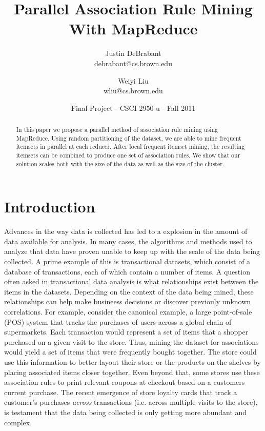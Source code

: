\documentclass[11pt]{article}
\begin{document}
\title{Parallel Association Rule Mining With MapReduce}
\author{Justin DeBrabant \\ debrabant@cs.brown.edu \and Weiyi Liu \\
  wliu@cs.brown.edu}
\date{Final Project - CSCI 2950-u - Fall 2011}
\maketitle

\begin{abstract}
In this paper we propose a parallel method of association rule mining
using MapReduce. Using random partitioning of the dataset, we are able
to mine frequent itemsets in parallel at each reducer. After local
frequent itemset mining, the resulting itemsets can be combined to
produce one set of association rules. We show that our solution scales
both with the size of the data as well as the size of the cluster.  
\end{abstract}

\section{Introduction}
\label{sec:intro}

Advances in the way data is collected has led to a explosion in the
amount of data available for analysis. In many cases, the algorithms
and methods used to analyze that data have proven unable to keep up
with the scale of the data being collected. A prime example of this is
transactional datasets, which consist of a database of transactions,
each of which contain a number of items. A question often asked in
transactional data analysis is what relationships exist between the
items in the datasets. Depending on the context of the data being
mined, these relationships can help make busineess decisions or
discover previouly unknown correlations. For example, consider the
canonical example, a large point-of-sale (POS) system that tracks the
purchases of users across a global chain of supermarkets. Each
transaction would represent a set of items that a shopper purchased on
a given visit to the store. Thus, mining the dataset for associations
would yield a set of items that were frequently bought together. The
store could use this information to better layout their store or the
products on the shelves by placing associated items closer
together. Even beyond that, some stores use these association rules to
print relevant coupons at checkout based on a customers current
purchase. The recent emergence of store loyalty cards that track a
customer's purchases \emph{across} transactions (i.e. across multiple
visits to the store), is testament that the data being collected is
only getting more abundant and complex.
\end{document}
